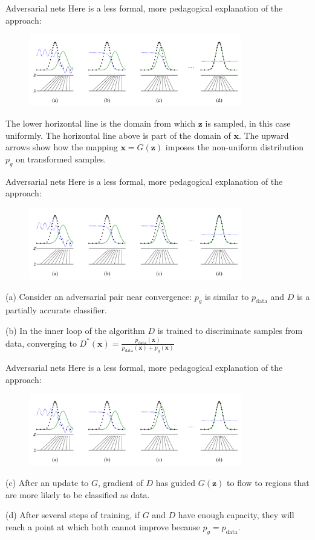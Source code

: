 \documentclass[10pt]{beamer}
\begin{document}
	\begin{frame}[t]{Adversarial nets}
		Here is a less formal, more pedagogical explanation of the approach:
		\begin{figure}
			\includegraphics[width=25em]{figures/GAN-pedagogical-explanation.png}
		\end{figure}
	 	The lower horizontal line is the domain from which $\bm{z}$ is sampled, in this case uniformly. The horizontal line above is part of the domain of $\bm{x}$. The upward arrows show how the mapping $\bm{x}=G(\bm{z})$ imposes the non-uniform distribution $p_g$ on transformed samples.
	\end{frame}

	\begin{frame}[t]{Adversarial nets}
		Here is a less formal, more pedagogical explanation of the approach:
		\begin{figure}
			\includegraphics[width=25em]{figures/GAN-pedagogical-explanation.png}
		\end{figure}
		(a) Consider an adversarial pair near convergence: $p_g$ is similar to $p_{\text{data}}$ and $D$ is a partially accurate classifier.
		
		(b) In the inner loop of the algorithm $D$ is trained to discriminate samples from data, converging to $D^*(\bm{x})=\frac{p_{\text{data}}(\bm{x})}{p_{\text{data}}(\bm{x})+p_g(\bm{x})}$
	\end{frame}

	\begin{frame}[t]{Adversarial nets}
		Here is a less formal, more pedagogical explanation of the approach:
		\begin{figure}
			\includegraphics[width=25em]{figures/GAN-pedagogical-explanation.png}
		\end{figure}
		(c) After an update to $G$, gradient of $D$ has guided $G(\bm{z})$ to flow to regions that are more likely to be classified as data.
		
		(d) After several steps of training, if $G$ and $D$ have enough capacity, they will reach a point at which both cannot improve because $p_g=p_{\text{data}}$.
	\end{frame}
\end{document}
